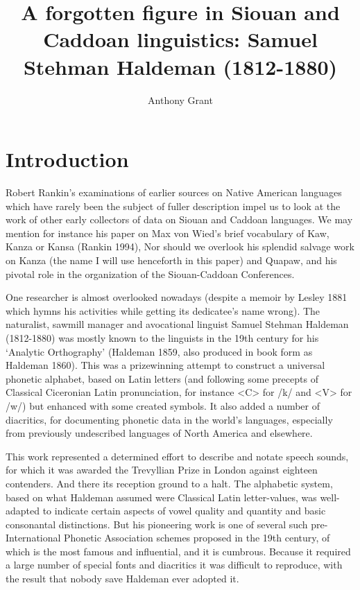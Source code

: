 \documentclass[output=paper]{LSP/langsci}
\author{Anthony Grant}
\title{A forgotten figure in Siouan and Caddoan linguistics:  Samuel Stehman Haldeman (1812-1880)}
\begin{document}
\section{Introduction}

Robert Rankin's examinations of earlier sources on Native American languages which have rarely been the subject of fuller description impel us to look at the work of other early collectors of data on Siouan and Caddoan languages. We may mention for instance his paper on Max von Wied's brief vocabulary of Kaw, Kanza or Kansa  (Rankin 1994), Nor should we overlook his splendid salvage work on Kanza (the name I will use henceforth in this paper) and Quapaw, and his pivotal role in the organization of the Siouan-Caddoan Conferences.

One researcher is almost overlooked nowadays (despite a memoir by Lesley 1881 which hymns his activities while getting its dedicatee's name wrong). The naturalist, sawmill manager and avocational linguist Samuel Stehman Haldeman (1812-1880)  was mostly known to the linguists in the 19th century for his `Analytic Orthography' (Haldeman 1859, also produced in book form as Haldeman 1860). This was a prizewinning attempt to construct a  universal phonetic alphabet, based on Latin letters (and following some precepts of Classical Ciceronian Latin pronunciation, for instance <C> for /k/ and <V> for /w/) but enhanced with some created symbols. It also added a number of diacritics,  for documenting phonetic data in the world's languages, especially from previously undescribed languages of North America and elsewhere.  

This work represented a determined effort to describe and notate speech sounds, for which it was awarded the Trevyllian Prize in London against eighteen contenders. And there its reception ground to a halt. The alphabetic system, based on what Haldeman assumed were Classical Latin letter-values,  was well-adapted to indicate certain aspects of vowel quality and quantity and basic consonantal distinctions. But his pioneering work is one of several such pre-International Phonetic Association  schemes proposed in the 19th century, of which \citet{Lepsius1863} is the most famous and influential, and it is cumbrous.  Because it required a large number of special fonts and diacritics it was difficult to reproduce, with the result that nobody save Haldeman ever adopted it.    
\end{document}
